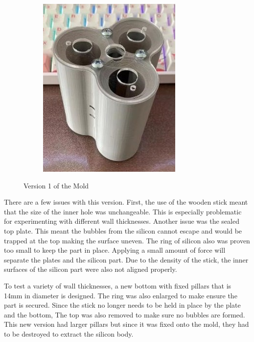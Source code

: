 \documentclass[twoside]{article}
\begin{document}
\begin{figure}[H]
\begin{subfigure}[b]{0.33\linewidth}
		\includegraphics[width=\textwidth]{assembled_v1}
	\end{subfigure}%
	\caption{Version 1 of the Mold}
\end{figure}

There are a few issues with this version. First, the use of the wooden stick meant that the size of the inner hole was unchangeable. This is especially problematic for experimenting with different wall thicknesses. Another issue was the sealed top plate. This meant the bubbles from the silicon cannot escape and would be trapped at the top making the surface uneven. The ring of silicon also was proven too small to keep the part in place. Applying a small amount of force will separate the plates and the silicon part. Due to the density of the stick, the inner surfaces of the silicon part were also not aligned properly. 

To test a variety of wall thicknesses, a new bottom with fixed pillars that is 14mm in diameter is designed. The ring was also enlarged to make ensure the part is secured. Since the stick no longer needs to be held in place by the plate and the bottom, The top was also removed to make sure no bubbles are formed. This new version had larger pillars but since it was fixed onto the mold, they had to be destroyed to extract the silicon body. 
\end{document}
